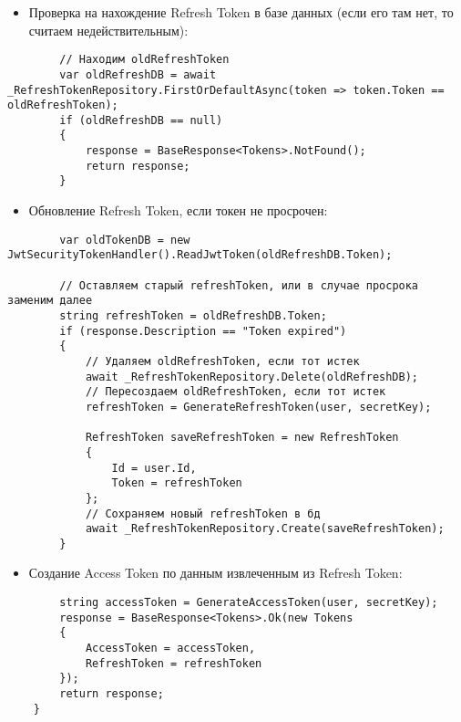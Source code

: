 \begin{itemize}
	\item{Проверка на нахождение Refresh Token в базе данных (если его там нет, то считаем недействительным):}
\end{itemize}
\begin{verbatim}
        // Находим oldRefreshToken
        var oldRefreshDB = await _RefreshTokenRepository.FirstOrDefaultAsync(token => token.Token == oldRefreshToken);
        if (oldRefreshDB == null)
        {
            response = BaseResponse<Tokens>.NotFound();
            return response;
        }
\end{verbatim}

\begin{itemize}
	\item{Обновление Refresh Token, если токен не просрочен:}
\end{itemize}
\begin{verbatim}
        var oldTokenDB = new JwtSecurityTokenHandler().ReadJwtToken(oldRefreshDB.Token);

        // Оставляем старый refreshToken, или в случае просрока заменим далее
        string refreshToken = oldRefreshDB.Token;
        if (response.Description == "Token expired")
        {
            // Удаляем oldRefreshToken, если тот истек
            await _RefreshTokenRepository.Delete(oldRefreshDB);
            // Пересоздаем oldRefreshToken, если тот истек
            refreshToken = GenerateRefreshToken(user, secretKey);

            RefreshToken saveRefreshToken = new RefreshToken
            {
                Id = user.Id,
                Token = refreshToken
            };
            // Сохраняем новый refreshToken в бд
            await _RefreshTokenRepository.Create(saveRefreshToken);
        }
\end{verbatim}

\begin{itemize}
	\item{Создание Access Token по данным извлеченным из Refresh Token:}
\end{itemize}
\begin{verbatim}
        string accessToken = GenerateAccessToken(user, secretKey);
        response = BaseResponse<Tokens>.Ok(new Tokens
        {
            AccessToken = accessToken,
            RefreshToken = refreshToken
        });
        return response;
    }
\end{verbatim}

